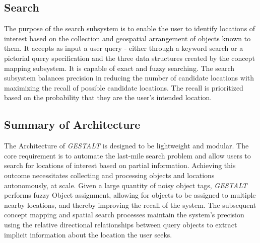 \subsection{Search}
The purpose of the search subsystem is to enable the user to identify locations of interest based on the collection and geospatial arrangement of objects known to them. 
It accepts as input a user query - either through a keyword search or a pictorial query specification and the three data structures created by the concept mapping subsystem. 
It is capable of exact and fuzzy searching. 
The search subsystem balances precision in reducing the number of candidate locations with maximizing the recall of possible candidate locations. 
The recall is prioritized based on the probability that they are the user's intended location. 



\subsection{Summary of Architecture}
The Architecture of \textit{GESTALT} is designed to be lightweight and modular. The core requirement is to automate the last-mile search problem and allow users to search for locations of interest based on partial information. 
Achieving this outcome necessitates collecting and processing objects and locations autonomously, at scale.
Given a large quantity of noisy object tags, \emph{GESTALT} performs fuzzy Object assignment, allowing for objects to be assigned to multiple nearby locations, and thereby improving the recall of the system.
The subsequent concept mapping and spatial search processes maintain the system's precision using the relative directional relationships between query objects to extract implicit information about the location the user seeks. 